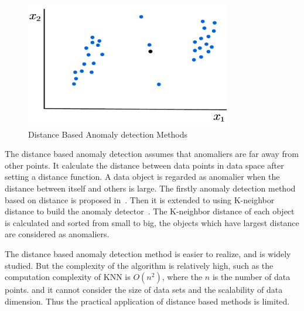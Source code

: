 \begin{figure}
  \centering
  \includegraphics[width=0.8\textwidth]{figures/distance.png}
  \caption{Distance Based  Anomaly detection Methods}\label{fig:distance}
\end{figure}

The distance based anomaly detection
assumes that
anomaliers are far away from other points.
It calculate the distance between data points in
data space after setting a distance function.
A data object is regarded as anomalier when
the distance between itself and others is large.
The firstly anomaly detection method
based on distance is proposed in~\cite{knorr1997unified}.
Then it is extended to using K-neighbor distance to
build the anomaly detector~\cite{ramaswamy2000efficient,kuang2008anomaly}.
The K-neighbor distance of each object is calculated and
sorted from small to big,
the objects which have largest
distance are considered as anomaliers.

The distance based anomaly detection method
is easier to realize,
and is widely studied.
But the complexity of the algorithm is relatively high,
such as the computation complexity of KNN is $O(n^2)$,
where the $n$ is the number of data points.
and it cannot consider the size of
data sets and the scalability of data dimension.
Thus the practical application of distance based methods is limited.

